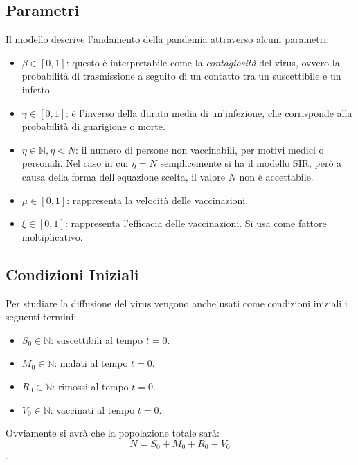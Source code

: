 \documentclass{article}
\begin{document}
\subsection{Parametri}
Il modello descrive l'andamento della pandemia attraverso alcuni 
parametri:
\begin{itemize} 
\item $\beta \in [0,1]$: questo è interpretabile come la 
\textit{contagiosità} del virus, ovvero la probabilità di 
trasmissione a seguito di un contatto tra un suscettibile e un infetto.
\item $\gamma \in [0,1]$: è l'inverso della durata media di 
un'infezione, che corrisponde alla probabilità di guarigione o morte.
\item $\eta \in \mathbb{N}, \eta < N$: il numero di persone non 
vaccinabili, per motivi medici o personali. Nel caso in cui 
$\eta = N$ semplicemente si ha il modello SIR, però a causa della 
forma dell'equazione scelta, il valore $N$ non è accettabile.
\item $\mu \in [0,1]$: rappresenta la velocità delle vaccinazioni.
\item $\xi \in [0,1]$: rappresenta l'efficacia delle vaccinazioni. 
Si usa come fattore moltiplicativo.
\end{itemize}

\subsection{Condizioni Iniziali}
Per studiare la diffusione del virus vengono anche usati come 
condizioni iniziali i seguenti termini:
\begin{itemize}
\item $S_0 \in \mathbb{N}$: suscettibili al tempo $t = 0$.
\item $M_0 \in \mathbb{N}$: malati al tempo $t = 0$.
\item $R_0 \in \mathbb{N}$: rimossi al tempo $t = 0$.
\item $V_0 \in \mathbb{N}$: vaccinati al tempo $t = 0$.
\end{itemize}
Ovviamente si avrà che la popolazione totale sarà: 
$$N = S_0 + M_0 + R_0 + V_0$$.\\
\end{document}
